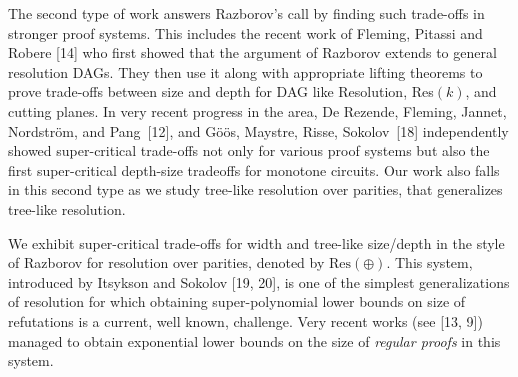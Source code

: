 The second type of work answers Razborov’s call by finding such trade-offs in stronger proof systems. This includes the recent work of Fleming, Pitassi and Robere [14] who first showed that the argument of Razborov extends to general resolution DAGs. They then use it along with appropriate lifting theorems to prove trade-offs between size and depth for DAG like Resolution, Res$(k)$, and cutting planes.
In very recent progress in the area,
De Rezende, Fleming, Jannet, Nordström, and Pang [12], and Göös, Maystre, Risse, Sokolov [18] independently showed super-critical trade-offs not only for various proof systems but also the first super-critical depth-size tradeoffs for monotone circuits.
Our work also falls in this second type as we study tree-like resolution over parities, that generalizes tree-like resolution.\par




We exhibit super-critical trade-offs for width and tree-like size/depth in the style of Razborov for resolution over parities, denoted by $\text{Res}(\oplus)$. This system, introduced by Itsykson and Sokolov [19, 20], is one of the simplest generalizations of resolution for which obtaining super-polynomial lower bounds on size of refutations is a current, well known, challenge. Very recent works (see [13, 9]) managed to obtain exponential lower bounds on the size of \emph{regular proofs} in this system.\par




